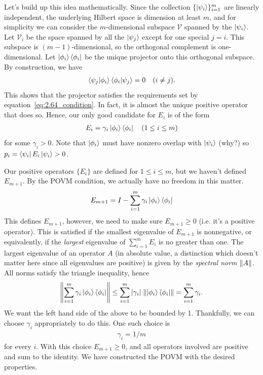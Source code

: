 \documentclass{book}
\begin{document}
    Let's build up this idea mathematically. Since the collection $\{\ket{\psi_i}\}_{i=1}^m$ are linearly independent, the underlying Hilbert space is dimension at least $m$, and for simplicity we can consider the $m$-dimensional subspace $\mathcal{V}$ spanned by the $\ket{\psi_i}$. Let $\mathcal{V}_i$ be the space spanned by all the $\ket{\psi_j}$ except for one special $j = i$. This subspace is $(m - 1)$-dimensional, so the orthogonal complement is one-dimensional. Let $\ket{\phi_i}\bra{\phi_i}$ be the unique projector onto this orthogonal subspace. By construction, we have
    \begin{align}        
        \bra{\psi_j} \ket{\phi_i} \bra{\phi_i}\ket{\psi_j} = 0 \quad (i \neq j).
    \end{align}
    This shows that the projector satisfies the requirements set by equation~\eqref{eq:2.64_condition}. In fact, it is almost the unique positive operator that does so. Hence, our only good candidate for $E_i$ is of the form
    \begin{align}
        E_i = \gamma_i \ket{\phi_i}\bra{\phi_i} \quad (1 \leq i \leq m)
    \end{align}
    for some $\gamma_i >0$. Note that $\ket{\phi_i}$ must have nonzero overlap with $\ket{\psi_i}$ (why?) so $p_i = \bra{\psi_i}E_i \ket{\psi_i} > 0$. 

    Our positive operators $\{E_i\}$ are defined for $1 \leq i \leq m$, but we haven't defined $E_{m+1}$. By the POVM condition, we actually have no freedom in this matter.
    \begin{align}
        E_{m+1} = I - \sum_{i=1}^m \gamma_i \ket{\phi_i}\bra{\phi_i}
    \end{align}
    This defines $E_{m+1}$, however, we need to make sure $E_{m+1} \geq 0$ (i.e. it's a positive operator). This is satisfied if the smallest eigenvalue of $E_{m+1}$ is nonnegative, or equivalently, if the \emph{largest} eigenvalue of $\sum_{i=1}^m E_i$ is no greater than one. The largest eigenvalue of an operator $A$ (in absolute value, a distinction which doesn't matter here since all eigenvalues are positive) is given by the \emph{spectral norm} $\norm{A}$. All norms satisfy the triangle inequality, hence
    \begin{align}
        \norm{\sum_{i=1}^m \gamma_i \ket{\phi_i}\bra{\phi_i}} \leq \sum_{i=1}^m \abs{\gamma_i} \;\norm{\ket{\phi_i}\bra{\phi_i}} = \sum_{i=1}^m \gamma_i.
    \end{align}
    We want the left hand side of the above to be bounded by 1. Thankfully, we can choose $\gamma_i$ appropriately to do this. One such choice is
    \begin{align}
        \gamma_i = 1/m
    \end{align}
    for every $i$. With this choice $E_{m+1} \geq 0$, and all operators involved are positive and sum to the identity. We have constructed the POVM with the desired properties. 
\end{document}
